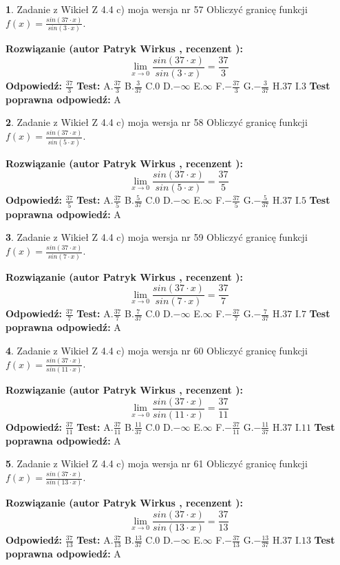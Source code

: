 \documentclass[12pt, a4paper]{article}
\theoremstyle{definition} %
\newtheorem{zad}{}
\newcommand{\zadStart}[1]{\begin{zad}#1\newline}
\newcommand{\zadStop}{\end{zad}}
\newcommand{\rozwStart}[2]{\noindent \textbf{Rozwiązanie (autor #1 , recenzent #2): }\newline}
\newcommand{\rozwStop}{\newline}
\newcommand{\odpStart}{\noindent \textbf{Odpowiedź:}\newline}
\newcommand{\odpStop}{\newline}
\newcommand{\testStart}{\noindent \textbf{Test:}\newline}
\newcommand{\testStop}{\newline}
\newcommand{\kluczStart}{\noindent \textbf{Test poprawna odpowiedź:}\newline}
\newcommand{\kluczStop}{\newline}
\begin{document}
\zadStart{Zadanie z Wikieł Z 4.4 c) moja wersja nr 57}
Obliczyć granicę funkcji $f(x)=\frac{sin(37\cdot x)}{sin(3\cdot x)}$.
\zadStop
\rozwStart{Patryk Wirkus}{}
$$\lim\limits_{x\to 0}\frac{sin(37\cdot x)}{sin(3\cdot x)}=
\frac{37}{3}$$
\rozwStop
\odpStart
$\frac{37}{3}$
\odpStop
\testStart
A.$\frac{37}{3}$
B.$\frac{3}{37}$
C.$0$
D.$-\infty$
E.$\infty$
F.$-\frac{37}{3}$
G.$-\frac{3}{37}$
H.$37$
I.$3$
\testStop
\kluczStart
A
\kluczStop



\zadStart{Zadanie z Wikieł Z 4.4 c) moja wersja nr 58}
Obliczyć granicę funkcji $f(x)=\frac{sin(37\cdot x)}{sin(5\cdot x)}$.
\zadStop
\rozwStart{Patryk Wirkus}{}
$$\lim\limits_{x\to 0}\frac{sin(37\cdot x)}{sin(5\cdot x)}=
\frac{37}{5}$$
\rozwStop
\odpStart
$\frac{37}{5}$
\odpStop
\testStart
A.$\frac{37}{5}$
B.$\frac{5}{37}$
C.$0$
D.$-\infty$
E.$\infty$
F.$-\frac{37}{5}$
G.$-\frac{5}{37}$
H.$37$
I.$5$
\testStop
\kluczStart
A
\kluczStop



\zadStart{Zadanie z Wikieł Z 4.4 c) moja wersja nr 59}
Obliczyć granicę funkcji $f(x)=\frac{sin(37\cdot x)}{sin(7\cdot x)}$.
\zadStop
\rozwStart{Patryk Wirkus}{}
$$\lim\limits_{x\to 0}\frac{sin(37\cdot x)}{sin(7\cdot x)}=
\frac{37}{7}$$
\rozwStop
\odpStart
$\frac{37}{7}$
\odpStop
\testStart
A.$\frac{37}{7}$
B.$\frac{7}{37}$
C.$0$
D.$-\infty$
E.$\infty$
F.$-\frac{37}{7}$
G.$-\frac{7}{37}$
H.$37$
I.$7$
\testStop
\kluczStart
A
\kluczStop



\zadStart{Zadanie z Wikieł Z 4.4 c) moja wersja nr 60}
Obliczyć granicę funkcji $f(x)=\frac{sin(37\cdot x)}{sin(11\cdot x)}$.
\zadStop
\rozwStart{Patryk Wirkus}{}
$$\lim\limits_{x\to 0}\frac{sin(37\cdot x)}{sin(11\cdot x)}=
\frac{37}{11}$$
\rozwStop
\odpStart
$\frac{37}{11}$
\odpStop
\testStart
A.$\frac{37}{11}$
B.$\frac{11}{37}$
C.$0$
D.$-\infty$
E.$\infty$
F.$-\frac{37}{11}$
G.$-\frac{11}{37}$
H.$37$
I.$11$
\testStop
\kluczStart
A
\kluczStop



\zadStart{Zadanie z Wikieł Z 4.4 c) moja wersja nr 61}
Obliczyć granicę funkcji $f(x)=\frac{sin(37\cdot x)}{sin(13\cdot x)}$.
\zadStop
\rozwStart{Patryk Wirkus}{}
$$\lim\limits_{x\to 0}\frac{sin(37\cdot x)}{sin(13\cdot x)}=
\frac{37}{13}$$
\rozwStop
\odpStart
$\frac{37}{13}$
\odpStop
\testStart
A.$\frac{37}{13}$
B.$\frac{13}{37}$
C.$0$
D.$-\infty$
E.$\infty$
F.$-\frac{37}{13}$
G.$-\frac{13}{37}$
H.$37$
I.$13$
\testStop
\kluczStart
A
\kluczStop
\end{document}
